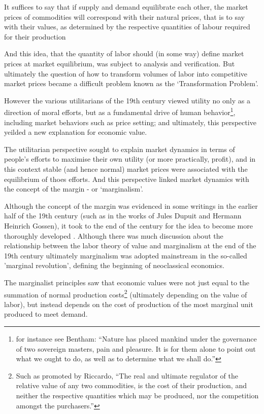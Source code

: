\begin{displayquote}
It suffices to say that if supply and demand equilibrate each other, the market prices of commodities will correspond with their natural prices, that is to say with their values, as determined by the respective quantities of labour required for their production \cite{marx1910value}
\end{displayquote}

And this idea, that the quantity of labor should (in some way) define market prices at market equilibrium, was subject to analysis and verification.
But ultimately the question of how to transform volumes of labor into competitive market prices became a difficult problem known as the `Transformation Problem'.

However the various utilitarians of the 19th century viewed utility no only as a direction of moral efforts, but as a fundamental drive of human behavior\footnote{for instance see Bentham: ``Nature has placed mankind under the governance of two sovereign masters, pain and pleasure.
It is for them alone to point out what we ought to do, as well as to determine what we shall do.''\cite{bentham1823introduction}}, including market behaviors such as price setting; and ultimately, this perspective yeilded a new explanation for economic value.

The utilitarian perspective sought to explain market dynamics in terms of people's efforts to maximise their own utility (or more practically, profit), and in this context stable (and hence normal) market prices were associated with the equilibrium of thoes efforts.
And this perspective linked market dynamics with the concept of the margin - or `marginalism'.

Although the concept of the margin was evidenced in some writings in the earlier half of the 19th century (such as in the works of Jules Dupuit and Hermann Heinrich Gossen), it took to the end of the century for the idea to become more thoroughly developed \cite{RePEc:ucp:jpolec:v:58:y:1950:p:307}.
Although there was much discussion about the relationship between the labor theory of value and marginalism at the end of the 19th century \cite{steedman2003socialism} ultimately marginalism was adopted mainstream in the so-called 'marginal revolution', defining the beginning of neoclassical economics.\cite{Opocher_2017, marginalism1}

The marginalist principles saw that economic values were not just equal to the summation of normal production costs\footnote{Such as promoted by Riccardo, ``The real and ultimate regulator of the relative value of any two commodities, is the cost of their production, and neither the respective quantities which may be produced, nor the competition amongst the purchasers.''\cite{Riccardo1Gutenberg}} (ultimately depending on the value of labor), but instead depends on the cost of production of the most marginal unit produced to meet demand.

